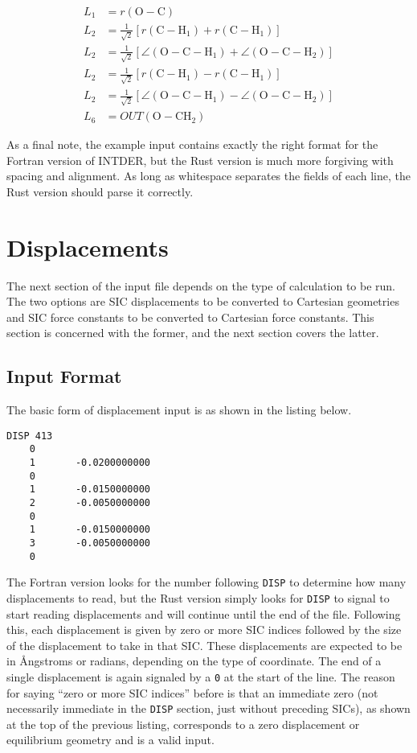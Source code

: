 \documentclass{article}
\begin{document}
\begin{align}
  L_1 &= r(\text{O}-\text{C}) \\
  L_2 &= \frac{1}{\sqrt{2}}[r(\text{C}-\text{H}_1) + r(\text{C}-\text{H}_1)]\\
  L_2 &= \frac{1}{\sqrt{2}}[\angle(\text{O}-\text{C}-\text{H}_1) + \angle(\text{O}-\text{C}-\text{H}_2)]\\
  L_2 &= \frac{1}{\sqrt{2}}[r(\text{C}-\text{H}_1) - r(\text{C}-\text{H}_1)]\\
  L_2 &= \frac{1}{\sqrt{2}}[\angle(\text{O}-\text{C}-\text{H}_1) - \angle(\text{O}-\text{C}-\text{H}_2)]\\
  L_6 &= OUT(\text{O}-\text{CH}_2)
\end{align}

As a final note, the example input contains exactly the right format for the
Fortran version of INTDER, but the Rust version is much more forgiving with
spacing and alignment. As long as whitespace separates the fields of each line,
the Rust version should parse it correctly.

\section{Displacements}
\label{sec:disp}

The next section of the input file depends on the type of calculation to be run.
The two options are SIC displacements to be converted to Cartesian geometries
and SIC force constants to be converted to Cartesian force constants. This
section is concerned with the former, and the next section covers the latter.

\subsection{Input Format}
\label{sec:disp-inp}

The basic form of displacement input is as shown in the listing below.

\begin{lstlisting}
DISP 413
    0
    1       -0.0200000000
    0
    1       -0.0150000000
    2       -0.0050000000
    0
    1       -0.0150000000
    3       -0.0050000000
    0
\end{lstlisting}

The Fortran version looks for the number following \verb|DISP| to determine how
many displacements to read, but the Rust version simply looks for \verb|DISP| to
signal to start reading displacements and will continue until the end of the
file. Following this, each displacement is given by zero or more SIC indices
followed by the size of the displacement to take in that SIC. These
displacements are expected to be in \AA{}ngstroms or radians, depending on the
type of coordinate. The end of a single displacement is again signaled by a
\verb|0| at the start of the line. The reason for saying ``zero or more SIC
indices'' before is that an immediate zero (not necessarily immediate in the
\verb|DISP| section, just without preceding SICs), as shown at the top of the
previous listing, corresponds to a zero displacement or equilibrium geometry and
is a valid input.
\end{document}
